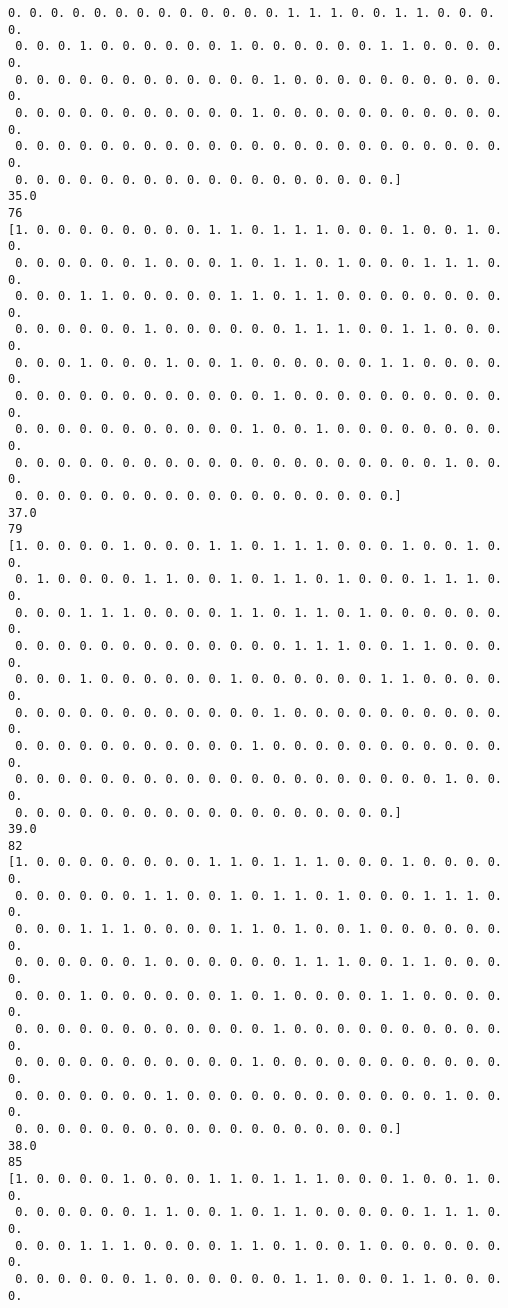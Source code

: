 \documentclass[11pt]{article}
\begin{document}
\begin{Verbatim}[commandchars=\\\{\}]
 0. 0. 0. 0. 0. 0. 0. 0. 0. 0. 0. 0. 0. 1. 1. 1. 0. 0. 1. 1. 0. 0. 0. 0.
 0. 0. 0. 1. 0. 0. 0. 0. 0. 0. 1. 0. 0. 0. 0. 0. 0. 1. 1. 0. 0. 0. 0. 0.
 0. 0. 0. 0. 0. 0. 0. 0. 0. 0. 0. 0. 1. 0. 0. 0. 0. 0. 0. 0. 0. 0. 0. 0.
 0. 0. 0. 0. 0. 0. 0. 0. 0. 0. 0. 1. 0. 0. 0. 0. 0. 0. 0. 0. 0. 0. 0. 0.
 0. 0. 0. 0. 0. 0. 0. 0. 0. 0. 0. 0. 0. 0. 0. 0. 0. 0. 0. 0. 0. 0. 0. 0.
 0. 0. 0. 0. 0. 0. 0. 0. 0. 0. 0. 0. 0. 0. 0. 0. 0. 0.]
35.0
76
[1. 0. 0. 0. 0. 0. 0. 0. 0. 1. 1. 0. 1. 1. 1. 0. 0. 0. 1. 0. 0. 1. 0. 0.
 0. 0. 0. 0. 0. 0. 1. 0. 0. 0. 1. 0. 1. 1. 0. 1. 0. 0. 0. 1. 1. 1. 0. 0.
 0. 0. 0. 1. 1. 0. 0. 0. 0. 0. 1. 1. 0. 1. 1. 0. 0. 0. 0. 0. 0. 0. 0. 0.
 0. 0. 0. 0. 0. 0. 1. 0. 0. 0. 0. 0. 0. 1. 1. 1. 0. 0. 1. 1. 0. 0. 0. 0.
 0. 0. 0. 1. 0. 0. 0. 1. 0. 0. 1. 0. 0. 0. 0. 0. 0. 1. 1. 0. 0. 0. 0. 0.
 0. 0. 0. 0. 0. 0. 0. 0. 0. 0. 0. 0. 1. 0. 0. 0. 0. 0. 0. 0. 0. 0. 0. 0.
 0. 0. 0. 0. 0. 0. 0. 0. 0. 0. 0. 1. 0. 0. 1. 0. 0. 0. 0. 0. 0. 0. 0. 0.
 0. 0. 0. 0. 0. 0. 0. 0. 0. 0. 0. 0. 0. 0. 0. 0. 0. 0. 0. 0. 1. 0. 0. 0.
 0. 0. 0. 0. 0. 0. 0. 0. 0. 0. 0. 0. 0. 0. 0. 0. 0. 0.]
37.0
79
[1. 0. 0. 0. 0. 1. 0. 0. 0. 1. 1. 0. 1. 1. 1. 0. 0. 0. 1. 0. 0. 1. 0. 0.
 0. 1. 0. 0. 0. 0. 1. 1. 0. 0. 1. 0. 1. 1. 0. 1. 0. 0. 0. 1. 1. 1. 0. 0.
 0. 0. 0. 1. 1. 1. 0. 0. 0. 0. 1. 1. 0. 1. 1. 0. 1. 0. 0. 0. 0. 0. 0. 0.
 0. 0. 0. 0. 0. 0. 0. 0. 0. 0. 0. 0. 0. 1. 1. 1. 0. 0. 1. 1. 0. 0. 0. 0.
 0. 0. 0. 1. 0. 0. 0. 0. 0. 0. 1. 0. 0. 0. 0. 0. 0. 1. 1. 0. 0. 0. 0. 0.
 0. 0. 0. 0. 0. 0. 0. 0. 0. 0. 0. 0. 1. 0. 0. 0. 0. 0. 0. 0. 0. 0. 0. 0.
 0. 0. 0. 0. 0. 0. 0. 0. 0. 0. 0. 1. 0. 0. 0. 0. 0. 0. 0. 0. 0. 0. 0. 0.
 0. 0. 0. 0. 0. 0. 0. 0. 0. 0. 0. 0. 0. 0. 0. 0. 0. 0. 0. 0. 1. 0. 0. 0.
 0. 0. 0. 0. 0. 0. 0. 0. 0. 0. 0. 0. 0. 0. 0. 0. 0. 0.]
39.0
82
[1. 0. 0. 0. 0. 0. 0. 0. 0. 1. 1. 0. 1. 1. 1. 0. 0. 0. 1. 0. 0. 0. 0. 0.
 0. 0. 0. 0. 0. 0. 1. 1. 0. 0. 1. 0. 1. 1. 0. 1. 0. 0. 0. 1. 1. 1. 0. 0.
 0. 0. 0. 1. 1. 1. 0. 0. 0. 0. 1. 1. 0. 1. 0. 0. 1. 0. 0. 0. 0. 0. 0. 0.
 0. 0. 0. 0. 0. 0. 1. 0. 0. 0. 0. 0. 0. 1. 1. 1. 0. 0. 1. 1. 0. 0. 0. 0.
 0. 0. 0. 1. 0. 0. 0. 0. 0. 0. 1. 0. 1. 0. 0. 0. 0. 1. 1. 0. 0. 0. 0. 0.
 0. 0. 0. 0. 0. 0. 0. 0. 0. 0. 0. 0. 1. 0. 0. 0. 0. 0. 0. 0. 0. 0. 0. 0.
 0. 0. 0. 0. 0. 0. 0. 0. 0. 0. 0. 1. 0. 0. 0. 0. 0. 0. 0. 0. 0. 0. 0. 0.
 0. 0. 0. 0. 0. 0. 0. 1. 0. 0. 0. 0. 0. 0. 0. 0. 0. 0. 0. 0. 1. 0. 0. 0.
 0. 0. 0. 0. 0. 0. 0. 0. 0. 0. 0. 0. 0. 0. 0. 0. 0. 0.]
38.0
85
[1. 0. 0. 0. 0. 1. 0. 0. 0. 1. 1. 0. 1. 1. 1. 0. 0. 0. 1. 0. 0. 1. 0. 0.
 0. 0. 0. 0. 0. 0. 1. 1. 0. 0. 1. 0. 1. 1. 0. 0. 0. 0. 0. 1. 1. 1. 0. 0.
 0. 0. 0. 1. 1. 1. 0. 0. 0. 0. 1. 1. 0. 1. 0. 0. 1. 0. 0. 0. 0. 0. 0. 0.
 0. 0. 0. 0. 0. 0. 1. 0. 0. 0. 0. 0. 0. 1. 1. 0. 0. 0. 1. 1. 0. 0. 0. 0.

\end{Verbatim}
\end{document}
